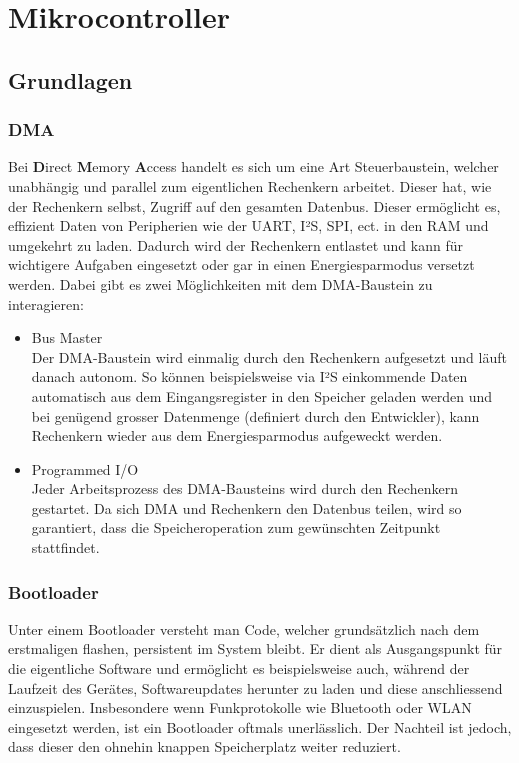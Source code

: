 \documentclass[12pt]{article}
\begin{document}
	\section{Mikrocontroller}\label{Mikrocontroller}
	\subsection{Grundlagen}
	\subsubsection*{DMA}
	Bei \textbf{D}irect \textbf{M}emory \textbf{A}ccess handelt es sich um eine Art Steuerbaustein, welcher unabhängig und parallel zum eigentlichen Rechenkern arbeitet. Dieser hat, wie der Rechenkern selbst, Zugriff auf den gesamten Datenbus. Dieser ermöglicht es, effizient Daten von Peripherien wie der UART, I²S, SPI, ect. in den RAM und umgekehrt zu laden. Dadurch wird der Rechenkern entlastet und kann für wichtigere Aufgaben eingesetzt oder gar in einen Energiesparmodus versetzt werden. Dabei gibt es zwei Möglichkeiten mit dem DMA-Baustein zu interagieren:
	\begin{itemize}
		\item Bus Master \\
		Der DMA-Baustein wird einmalig durch den Rechenkern aufgesetzt und läuft danach autonom. So können beispielsweise via I²S einkommende Daten automatisch aus dem Eingangsregister in den Speicher geladen werden und bei genügend grosser Datenmenge (definiert durch den Entwickler), kann Rechenkern wieder aus dem Energiesparmodus aufgeweckt werden.
		\item Programmed I/O \\
		Jeder Arbeitsprozess des DMA-Bausteins wird durch den Rechenkern gestartet. Da sich DMA und Rechenkern den Datenbus teilen, wird so garantiert, dass die Speicheroperation zum gewünschten Zeitpunkt stattfindet.
	\end{itemize}
	\subsubsection*{Bootloader}
	Unter einem Bootloader versteht man Code, welcher grundsätzlich nach dem erstmaligen flashen, persistent im System bleibt. Er dient als Ausgangspunkt für die eigentliche Software und ermöglicht es beispielsweise auch, während der Laufzeit des Gerätes, Softwareupdates herunter zu laden und diese anschliessend einzuspielen. Insbesondere wenn Funkprotokolle wie Bluetooth oder WLAN eingesetzt werden, ist ein Bootloader oftmals unerlässlich. Der Nachteil ist jedoch, dass dieser den ohnehin knappen Speicherplatz weiter reduziert.
\end{document}
